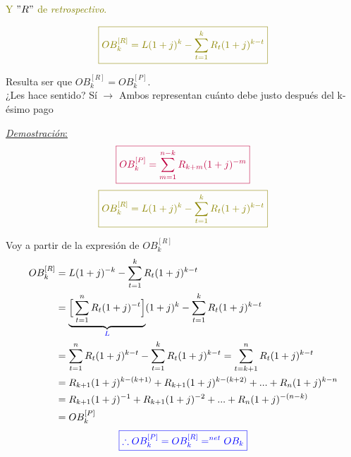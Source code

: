 \textcolor{olive}{Y $"R"$ de \textit{retrospectivo}.}

$$\textcolor{olive}{\boxed{OB_k^{[R]} = L(1+j)^k - \sum_{t=1}^k R_t(1+j)^{k-t}}}$$

Resulta ser que $OB_k^{[R]} = OB_k^{[P]}$.\\
¿Les hace sentido? Sí $\longrightarrow$ Ambos representan cuánto debe justo después del k-ésimo pago

\underline{\textit{Demostración}:}
$$\textcolor{purple}{\boxed{OB_k^{[P]} = \sum_{m=1}^{n-k} R_{k+m}(1+j)^{-m}}}$$
$$\textcolor{olive}{\boxed{OB_k^{[R]} = L(1+j)^k - \sum_{t=1}^k R_t(1+j)^{k-t}}}$$

Voy a partir de la expresión de $OB_k^{[R]}$
\begin{align*}
    OB_k^{[R]} &= L(1+j)^{-k} - \sum_{t=1}^k R_t(1+j)^{k-t}\\
    &= \underbrace{\Big[\sum_{t=1}^n R_t(1+j)^{-t}\Big]}_{\textcolor{blue}{L}}(1+j)^k - \sum_{t=1}^k R_t(1+j)^{k-t}\\
    &= \sum_{t=1}^n R_t(1+j)^{k-t} - \sum_{t=1}^k R_t(1+j)^{k-t} = \sum_{t=k+1}^nR_t(1+j)^{k-t}\\
    &= R_{k+1}(1+j)^{k-(k+1)} + R_{k+1}(1+j)^{k-(k+2)} +...+ R_n(1+j)^{k-n}\\
    &= R_{k+1}(1+j)^{-1} + R_{k+1}(1+j)^{-2} +...+ R_n(1+j)^{-(n-k)} \\
    &= OB_k^{[P]}
\end{align*}
$$\textcolor{blue}{\boxed{\therefore OB_k^{[P]} = OB_k^{[R]} =^{net} OB_k}}$$

